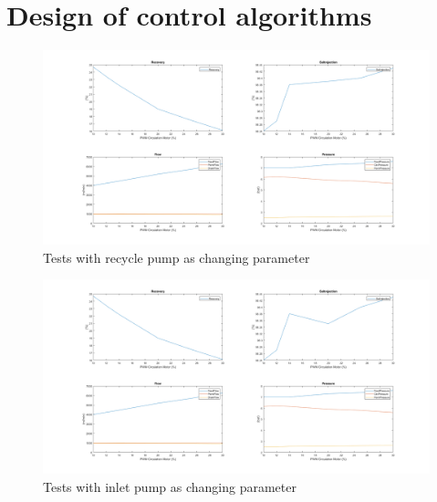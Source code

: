 \section{Design of control algorithms}

\begin{figure}[h]
    \centering
    \includegraphics[width=1.65\textwidth, angle = 270]{PreTestReg1.png}
    \caption{Tests with recycle pump as changing parameter}
    \label{fig:PreTestReg1}
\end{figure}

\begin{figure}[h]
    \centering 
    \includegraphics[width=1.65\textwidth, angle=270]{PreTestReg3.png}
    \caption{Tests with inlet pump as changing parameter}
    \label{fig:PreTestReg3}
\end{figure}





